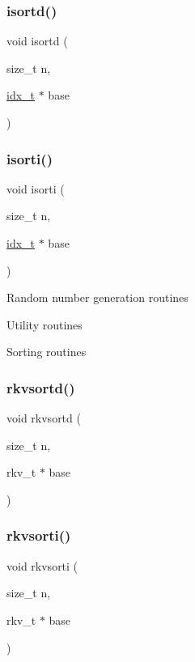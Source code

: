 \subsubsection{\texorpdfstring{isortd()}{isortd()}}
{\footnotesize\ttfamily void isortd (\begin{DoxyParamCaption}\item[{size\+\_\+t}]{n,  }\item[{\hyperlink{a00876_aaa5262be3e700770163401acb0150f52}{idx\+\_\+t} $\ast$}]{base }\end{DoxyParamCaption})}

\mbox{\label{a00206_afc154279aa00bea9ce5c90b8c6906cc6}} 
\subsubsection{\texorpdfstring{isorti()}{isorti()}}
{\footnotesize\ttfamily void isorti (\begin{DoxyParamCaption}\item[{size\+\_\+t}]{n,  }\item[{\hyperlink{a00876_aaa5262be3e700770163401acb0150f52}{idx\+\_\+t} $\ast$}]{base }\end{DoxyParamCaption})}

Random number generation routines

Utility routines

Sorting routines \mbox{\label{a00206_a6961f443a10dc76ff07a0c3498a808cb}} 
\subsubsection{\texorpdfstring{rkvsortd()}{rkvsortd()}}
{\footnotesize\ttfamily void rkvsortd (\begin{DoxyParamCaption}\item[{size\+\_\+t}]{n,  }\item[{rkv\+\_\+t $\ast$}]{base }\end{DoxyParamCaption})}

\mbox{\label{a00206_aa153a7b3b6df7eba8a8bd089764acf27}} 
\subsubsection{\texorpdfstring{rkvsorti()}{rkvsorti()}}
{\footnotesize\ttfamily void rkvsorti (\begin{DoxyParamCaption}\item[{size\+\_\+t}]{n,  }\item[{rkv\+\_\+t $\ast$}]{base }\end{DoxyParamCaption})}

